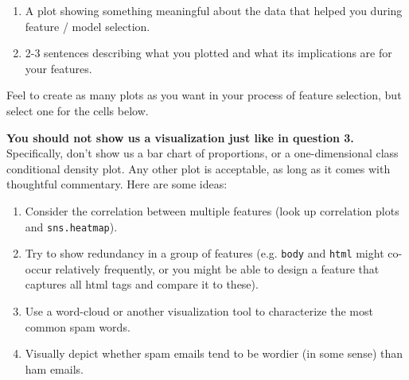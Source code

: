 \documentclass[11pt]{article}
\providecommand{\tightlist}{%
      \setlength{\itemsep}{0pt}\setlength{\parskip}{0pt}}
\begin{document}
\begin{enumerate}
\def\labelenumi{\arabic{enumi}.}
\tightlist
\item
  A plot showing something meaningful about the data that helped you
  during feature / model selection.
\item
  2-3 sentences describing what you plotted and what its implications
  are for your features.
\end{enumerate}

Feel to create as many plots as you want in your process of feature
selection, but select one for the cells below.

\textbf{You should not show us a visualization just like in question 3.}
Specifically, don't show us a bar chart of proportions, or a
one-dimensional class conditional density plot. Any other plot is
acceptable, as long as it comes with thoughtful commentary. Here are
some ideas:

\begin{enumerate}
\def\labelenumi{\arabic{enumi}.}
\tightlist
\item
  Consider the correlation between multiple features (look up
  correlation plots and \texttt{sns.heatmap}).
\item
  Try to show redundancy in a group of features (e.g. \texttt{body} and
  \texttt{html} might co-occur relatively frequently, or you might be
  able to design a feature that captures all html tags and compare it to
  these).
\item
  Use a word-cloud or another visualization tool to characterize the
  most common spam words.
\item
  Visually depict whether spam emails tend to be wordier (in some sense)
  than ham emails.
\end{enumerate}
\end{document}
